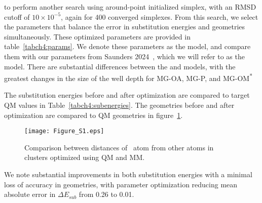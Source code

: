 to perform another search using around-point initialized simplex, with an RMSD cutoff of $10\times{}10^{-5}$, again for 400 converged simplexes. From this search, we select the parameters that balance
the error in substitution energies and geometries simultaneously. 
These optimized parameters are provided in table~\ref{tabch4:params}. We denote these parameters as the  model, and compare them with our parameters from 
Saunders \etal{} 2024~\cite{saunders:2024}, which we will refer to as the  model.
There are substantial differences between the  and  models, with the greatest changes in the size of the well depth \epsilonij{} for MG-OA, MG-P, and MG-OM\textsuperscript{*}

The substitution energies before and after optimization are compared to target QM values in Table~\ref{tabch4:subenergies}. The geometries before and after optimization are compared to QM geometries in figure~\ref{figch4:optres}. 
\begin{landscape}
\centering
\begin{figure}
    \caption[Geometry of optimized clusters of small molecules]{Comparison between distances of \mg~atom from other atoms in clusters optimized using QM and MM.}
    \label{figch4:optres}
    \texttt{[image: Figure\_S1.eps]}
\end{figure}
\end{landscape}
We note substantial improvements in both substitution energies with a minimal loss of accuracy in geometries, 
with parameter optimization reducing mean absolute error in $\Delta E_{sub}$ from 0.26 to 0.01. %

